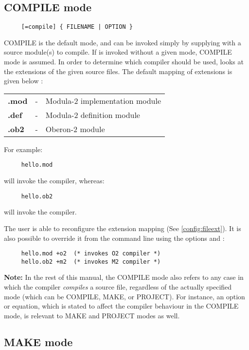 \subsection{COMPILE mode}\label{xc:modes:compile}

\verb'    '\xc{}\verb' [=compile] { FILENAME | OPTION }'

COMPILE is the default mode, and can be invoked simply by  supplying
\xc{} with a source module(s) to compile. If \xc{} is invoked without a
given  mode, COMPILE mode is assumed. In order to determine which
compiler should be used, \xc{} looks at the extensions of the given source
files. The default mapping of extensions is given below :
\begin{flushleft}
\begin{tabular}{lcl}
\bf        .mod  &-& Modula-2 implementation module \\
\bf        .def  &-& Modula-2 definition module     \\
\bf        .ob2  &-& Oberon-2 module                \\
\end{tabular}
\end{flushleft}

For example:

\verb'    '\xc{}\verb' hello.mod'

will invoke the \mt{} compiler, whereas:

\verb'    '\xc{}\verb' hello.ob2'

will invoke the \ot{} compiler.

The user is able to reconfigure  the  extension  mapping
(See \ref{config:fileext}). It is also
possible to override it from the command line
using the options  and :

\verb'    '\xc{}\verb' hello.mod +o2  (* invokes O2 compiler *)'  \\
\verb'    '\xc{}\verb' hello.ob2 +m2  (* invokes M2 compiler *)'

{\bf Note:} In the rest of this manual, the COMPILE mode also
refers to any case in which the compiler {\it compiles}
a source file, regardless of the actually specified mode
(which can be COMPILE, MAKE, or PROJECT).
For instance, an option or equation, which is stated to affect
the compiler behaviour in the COMPILE mode, is relevant to
MAKE and PROJECT modes as well.

\subsection{MAKE mode}\label{xc:modes:make}

